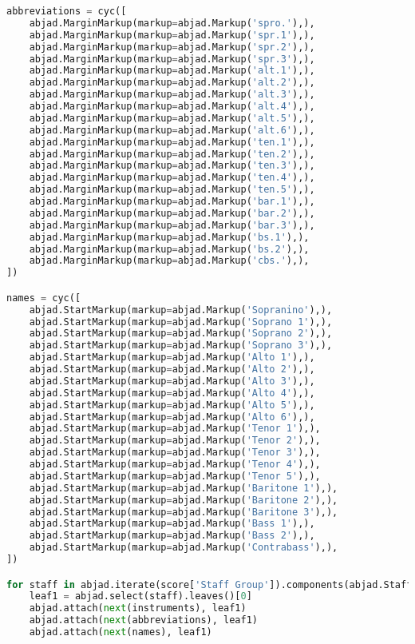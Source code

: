\begin{lstlisting}[language=Python, caption=Invocation Source Code]
abbreviations = cyc([
    abjad.MarginMarkup(markup=abjad.Markup('spro.'),),
    abjad.MarginMarkup(markup=abjad.Markup('spr.1'),),
    abjad.MarginMarkup(markup=abjad.Markup('spr.2'),),
    abjad.MarginMarkup(markup=abjad.Markup('spr.3'),),
    abjad.MarginMarkup(markup=abjad.Markup('alt.1'),),
    abjad.MarginMarkup(markup=abjad.Markup('alt.2'),),
    abjad.MarginMarkup(markup=abjad.Markup('alt.3'),),
    abjad.MarginMarkup(markup=abjad.Markup('alt.4'),),
    abjad.MarginMarkup(markup=abjad.Markup('alt.5'),),
    abjad.MarginMarkup(markup=abjad.Markup('alt.6'),),
    abjad.MarginMarkup(markup=abjad.Markup('ten.1'),),
    abjad.MarginMarkup(markup=abjad.Markup('ten.2'),),
    abjad.MarginMarkup(markup=abjad.Markup('ten.3'),),
    abjad.MarginMarkup(markup=abjad.Markup('ten.4'),),
    abjad.MarginMarkup(markup=abjad.Markup('ten.5'),),
    abjad.MarginMarkup(markup=abjad.Markup('bar.1'),),
    abjad.MarginMarkup(markup=abjad.Markup('bar.2'),),
    abjad.MarginMarkup(markup=abjad.Markup('bar.3'),),
    abjad.MarginMarkup(markup=abjad.Markup('bs.1'),),
    abjad.MarginMarkup(markup=abjad.Markup('bs.2'),),
    abjad.MarginMarkup(markup=abjad.Markup('cbs.'),),
])

names = cyc([
    abjad.StartMarkup(markup=abjad.Markup('Sopranino'),),
    abjad.StartMarkup(markup=abjad.Markup('Soprano 1'),),
    abjad.StartMarkup(markup=abjad.Markup('Soprano 2'),),
    abjad.StartMarkup(markup=abjad.Markup('Soprano 3'),),
    abjad.StartMarkup(markup=abjad.Markup('Alto 1'),),
    abjad.StartMarkup(markup=abjad.Markup('Alto 2'),),
    abjad.StartMarkup(markup=abjad.Markup('Alto 3'),),
    abjad.StartMarkup(markup=abjad.Markup('Alto 4'),),
    abjad.StartMarkup(markup=abjad.Markup('Alto 5'),),
    abjad.StartMarkup(markup=abjad.Markup('Alto 6'),),
    abjad.StartMarkup(markup=abjad.Markup('Tenor 1'),),
    abjad.StartMarkup(markup=abjad.Markup('Tenor 2'),),
    abjad.StartMarkup(markup=abjad.Markup('Tenor 3'),),
    abjad.StartMarkup(markup=abjad.Markup('Tenor 4'),),
    abjad.StartMarkup(markup=abjad.Markup('Tenor 5'),),
    abjad.StartMarkup(markup=abjad.Markup('Baritone 1'),),
    abjad.StartMarkup(markup=abjad.Markup('Baritone 2'),),
    abjad.StartMarkup(markup=abjad.Markup('Baritone 3'),),
    abjad.StartMarkup(markup=abjad.Markup('Bass 1'),),
    abjad.StartMarkup(markup=abjad.Markup('Bass 2'),),
    abjad.StartMarkup(markup=abjad.Markup('Contrabass'),),
])

for staff in abjad.iterate(score['Staff Group']).components(abjad.Staff):
    leaf1 = abjad.select(staff).leaves()[0]
    abjad.attach(next(instruments), leaf1)
    abjad.attach(next(abbreviations), leaf1)
    abjad.attach(next(names), leaf1)


\end{lstlisting}
